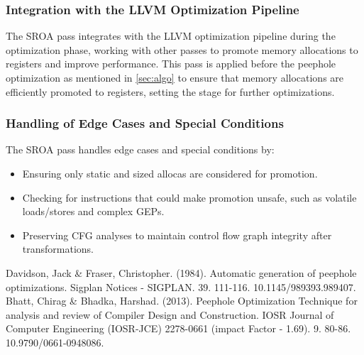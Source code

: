 \documentclass[conference]{IEEEtran}
\begin{document}
\subsubsection{Integration with the LLVM Optimization Pipeline}
The SROA pass integrates with the LLVM optimization pipeline during the optimization phase, working with other passes to promote memory allocations to registers and improve performance. This pass is applied before the peephole optimization as mentioned in \ref{sec:algo} to ensure that memory allocations are efficiently promoted to registers, setting the stage for further optimizations.


\subsubsection{Handling of Edge Cases and Special Conditions}
The SROA pass handles edge cases and special conditions by:
\begin{itemize}
	\item Ensuring only static and sized allocas are considered for promotion.
	\item Checking for instructions that could make promotion unsafe, such as volatile loads/stores and complex GEPs.
	\item Preserving CFG analyses to maintain control flow graph integrity after transformations.
\end{itemize}

\begin{thebibliography}{00}
	 Davidson, Jack \& Fraser, Christopher. (1984). Automatic generation of peephole optimizations. Sigplan Notices - SIGPLAN. 39. 111-116. 10.1145/989393.989407.
	 Bhatt, Chirag \& Bhadka, Harshad. (2013). Peephole Optimization Technique for analysis and review of Compiler Design and Construction. IOSR Journal of Computer Engineering (IOSR-JCE) 2278-0661 (impact Factor - 1.69). 9. 80-86. 10.9790/0661-0948086.
\end{thebibliography}
\end{document}
